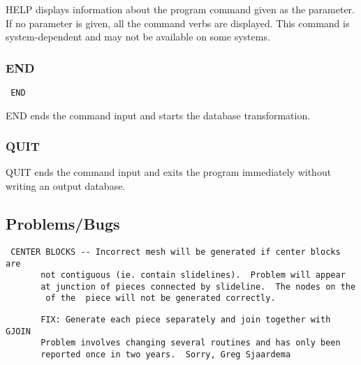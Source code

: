 HELP displays information about the program command given as the
parameter.  If no parameter is given, all the command verbs are
displayed.  This command is system-dependent and may not be available on
some systems.
\subsubsection{END}
\begin{verbatim}
 END
\end{verbatim}

END ends the command input and starts the database transformation.
\subsubsection{QUIT}
QUIT ends the command input and exits the program immediately without
writing an output database. 
\subsection{Problems/Bugs}
\begin{verbatim}
 CENTER BLOCKS -- Incorrect mesh will be generated if center blocks are
       not contiguous (ie. contain slidelines).  Problem will appear
       at junction of pieces connected by slideline.  The nodes on the
        of the  piece will not be generated correctly.
\end{verbatim}

\begin{verbatim}
       FIX: Generate each piece separately and join together with GJOIN
       Problem involves changing several routines and has only been
       reported once in two years.  Sorry, Greg Sjaardema
\end{verbatim}

